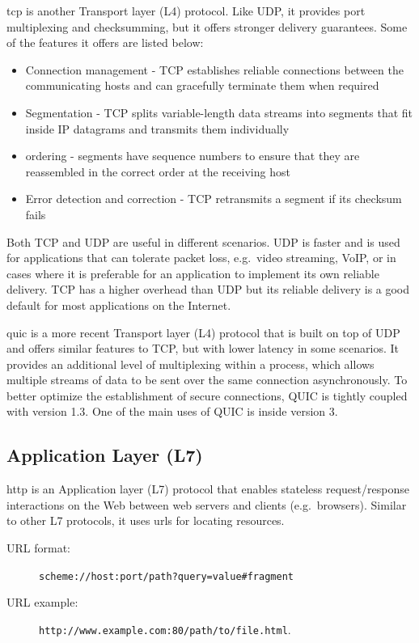 \gls{tcp} is another Transport layer (L4) protocol. Like UDP, it provides port multiplexing and checksumming, but it offers stronger delivery guarantees. Some of the features it offers are listed below:

\begin{itemize}
\tightlist
\item
  Connection management - TCP establishes reliable connections between the communicating hosts and can gracefully terminate them when required
\item
  Segmentation - TCP splits variable-length data streams into segments that fit inside IP datagrams and transmits them individually
\item
  ordering - segments have sequence numbers to ensure that they are reassembled in the correct order at the receiving host
\item
  Error detection and correction - TCP retransmits a segment if its checksum fails
\end{itemize}

Both TCP and UDP are useful in different scenarios. UDP is faster and is used for applications that can tolerate packet loss, e.g.~video streaming, VoIP, or in cases where it is preferable for an application to implement its own reliable delivery. TCP has a higher overhead than UDP but its reliable delivery is a good default for most applications on the Internet.

\gls{quic} is a more recent Transport layer (L4) protocol that is built on top of UDP and offers similar features to TCP, but with lower latency in some scenarios. It provides an additional level of multiplexing within a process, which allows multiple streams of data to be sent over the same connection asynchronously. To better optimize the establishment of secure connections, QUIC is tightly coupled with  version 1.3. One of the main uses of QUIC is inside  version 3.

\subsection{Application Layer (L7)}\label{thesis__020-internet.md__application-layer-l7}

\gls{http} is an Application layer (L7) protocol that enables stateless request/response interactions on the Web between web servers and clients (e.g.~browsers). Similar to other L7 protocols, it uses \glspl{url} for locating resources.

\begin{description}
\item[URL format:]
\texttt{scheme://host:port/path?query=value\#fragment}
\item[URL example:]
\texttt{http://www.example.com:80/path/to/file.html}.
\end{description}

